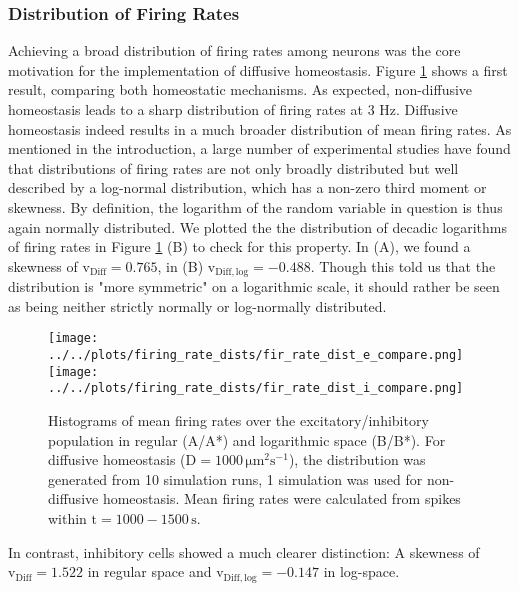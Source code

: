 \documentclass[10pt,a4paper]{article}
\begin{document}
\subsubsection{Distribution of Firing Rates}\label{Fir_Dist_Section}
Achieving a broad distribution of firing rates among neurons was the core motivation for the implementation of diffusive homeostasis. Figure \ref{Fir_Rate_Dist_Compare} shows a first result, comparing both homeostatic mechanisms. As expected, non-diffusive homeostasis leads to a sharp distribution of firing rates at 3 Hz. Diffusive homeostasis indeed results in a much broader distribution of mean firing rates. As mentioned in the introduction, a large number of experimental studies have found that distributions of firing rates are not only broadly distributed but well described by a log-normal distribution, which has a non-zero third moment or skewness. By definition, the logarithm of the random variable in question is thus again normally distributed. We plotted the the distribution of decadic logarithms of firing rates in Figure \ref{Fir_Rate_Dist_Compare} (B) to check for this property. In (A), we found a skewness of $\mathrm{v_{Diff} = 0.765}$, in (B) $\mathrm{v_{Diff,log} = -0.488}$. Though this told us that the distribution is "more symmetric" on a logarithmic scale, it should rather be seen as being neither strictly normally or log-normally distributed.  
\begin{figure}
\texttt{[image: ../../plots/firing\_rate\_dists/fir\_rate\_dist\_e\_compare.png]}
\texttt{[image: ../../plots/firing\_rate\_dists/fir\_rate\_dist\_i\_compare.png]}
\caption{Histograms of mean firing rates over the excitatory/inhibitory population in regular (A/A*) and logarithmic space (B/B*). For diffusive homeostasis ($\mathrm{D=1000\, \mu m^2 s^{-1}}$), the distribution was generated from 10 simulation runs, 1 simulation was used for non-diffusive homeostasis. Mean firing rates were calculated from spikes within $\mathrm{t=1000-1500\,s}$.}
\label{Fir_Rate_Dist_Compare}
\end{figure}
In contrast, inhibitory cells showed a much clearer distinction: A skewness of $\mathrm{v_{Diff} = 1.522}$ in regular space and $\mathrm{v_{Diff,log} = -0.147}$ in log-space.
\end{document}
